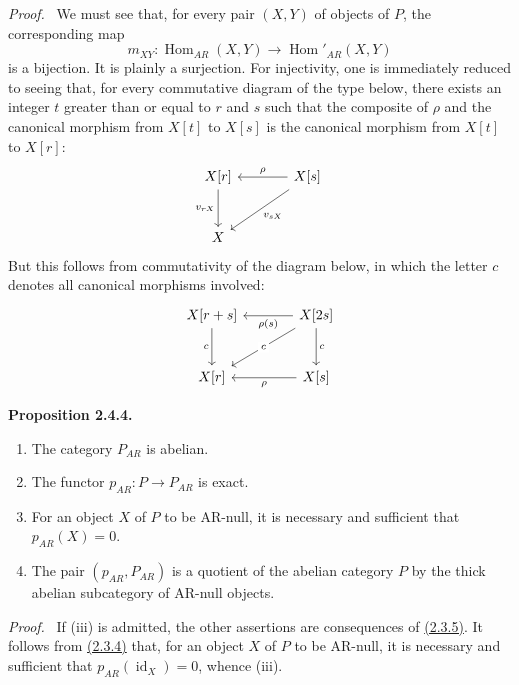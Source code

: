 \documentclass[11pt]{article}
\newenvironment{statement}[1]{\par\medskip\noindent\textbf{#1.}\ }{\par\medskip}
\newenvironment{prooftext}[1][Proof]{\par\noindent\emph{#1.}\ }{\par\medskip}
\DeclareMathOperator{\Hom}{Hom}
\providecommand{\id}{\operatorname{id}}
\providecommand{\Hom}{\operatorname{Hom}}
\providecommand{\id}{\operatorname{id}}
\providecommand{\id}{\operatorname{id}}
\providecommand{\id}{\operatorname{id}}
\providecommand{\id}{\operatorname{id}}
\providecommand{\Hom}{\operatorname{Hom}}
\providecommand{\id}{\operatorname{id}}
\begin{document}
\begin{prooftext}[Proof]
We must see that, for every pair $(X,Y)$ of objects of $P$, the corresponding map
\[
m_{XY}:\Hom_{AR}(X,Y)\longrightarrow\Hom'_{AR}(X,Y)
\]
is a bijection. It is plainly a surjection. For injectivity, one is immediately reduced to seeing that, for every commutative diagram of the type below, there exists an integer $t$ greater than or equal to $r$ and $s$ such that the composite of $\rho$ and the canonical morphism from $X[t]$ to $X[s]$ is the canonical morphism from $X[t]$ to $X[r]$:
\[
\begin{tikzcd}[column sep=large,row sep=large]
X[r] \arrow[d,"{v_{rX}}"'] & X[s] \arrow[l,"\rho"'] \arrow[dl,"{v_{sX}}"]\\
X & {}
\end{tikzcd}
\]
But this follows from commutativity of the diagram below, in which the letter $c$ denotes all canonical morphisms involved:
\[
\begin{tikzcd}[column sep=large,row sep=large]
X[r+s] \arrow[d,"c"'] & X[2s] \arrow[l,"\rho(s)"] \arrow[d,"c"] \arrow[dl,"c" description]\\
X[r] & X[s] \arrow[l,"\rho"]
\end{tikzcd}
\]
\end{prooftext}

\label{sga5:V:proposition:2.4.4}\begin{statement}{Proposition 2.4.4}
\begin{enumerate}[label=(\roman*)]
\item The category $P_{AR}$ is abelian.
\item The functor $p_{AR}:P\to P_{AR}$ is exact.
\item For an object $X$ of $P$ to be AR-null, it is necessary and sufficient that $p_{AR}(X)=0$.
\item The pair $(p_{AR},P_{AR})$ is a quotient of the abelian category $P$ by the thick abelian subcategory of AR-null objects.
\end{enumerate}
\end{statement}

\begin{prooftext}[Proof]
If (iii) is admitted, the other assertions are consequences of \hyperref[sga5:V:subsubsection:2.3.5]{(2.3.5)}. It follows from \hyperref[sga5:V:subsubsection:2.3.4]{(2.3.4)} that, for an object $X$ of $P$ to be AR-null, it is necessary and sufficient that $p_{AR}(\id_X)=0$, whence (iii).
\end{prooftext}
\end{document}

